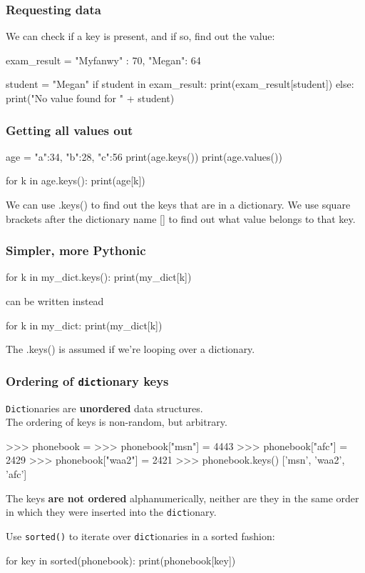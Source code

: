 \documentclass{beamer}
\begin{document}
\begin{frame}[fragile]
\frametitle{Requesting data}
We can check if a key is present, and if so, find out the
value:
\begin{code}
exam_result = {"Myfanwy" : 70, "Megan": 64}

student = "Megan"
if student in exam_result:
   print(exam_result[student])
else:
   print("No value found for " + student)
\end{code}
\end{frame}

\begin{frame}[fragile]
\frametitle{Getting all values out}
\begin{code}
age = { "a":34, "b":28, "c":56 }
print(age.keys())
print(age.values())

for k in age.keys():
   print(age[k])
\end{code}
We can use .keys() to find out the keys that are in a dictionary.
We use square brackets after the dictionary name [] to find
out what value belongs to that key.
\end{frame}

\begin{frame}[fragile]
\frametitle{Simpler, more Pythonic}
\begin{code}
for k in my_dict.keys():
   print(my_dict[k])
\end{code}
can be written instead
\begin{code}
for k in my_dict:
   print(my_dict[k])
\end{code}
The .keys() is assumed if we're looping over a dictionary.
\end{frame}


\begin{frame}[fragile]
\frametitle{Ordering of \texttt{dict}ionary keys}
\texttt{Dict}ionaries are \textbf{unordered} data structures.\\
The ordering of keys is non-random, but arbitrary.
\begin{code}
>>> phonebook = {}
>>> phonebook["msn"] = 4443
>>> phonebook["afc"] = 2429
>>> phonebook["waa2"] = 2421 
>>> phonebook.keys()
['msn', 'waa2', 'afc']
\end{code}
The keys \textbf{are not ordered} alphanumerically, neither are they in the same
order in which they were inserted into the \texttt{dict}ionary.
\vskip 0.3cm

Use \texttt{sorted()} to iterate over \texttt{dict}ionaries in a sorted fashion:
\begin{code}
for key in sorted(phonebook):
   print(phonebook[key])
\end{code}
\end{frame}
\end{document}
